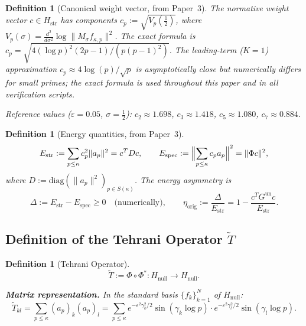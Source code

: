 \documentclass[11pt]{article}
\newtheorem{definition}[theorem]{Definition}
\newcommand{\Hstr}{H_{\mathrm{str}}}
\newcommand{\Hnull}{H_{\mathrm{null}}}
\newcommand{\Estr}{E_{\mathrm{str}}}
\newcommand{\Espec}{E_{\mathrm{spec}}}
\newcommand{\etaorig}{\eta_{\mathrm{orig}}}
\newcommand{\Gun}{G^{\mathrm{un}}}
\newcommand{\Tt}{\widetilde{T}}
\begin{document}
\begin{definition}[Canonical weight vector, from Paper~3]
The normative weight vector $c\in\Hstr$ has components
$c_p := \sqrt{V_p(\tfrac{1}{2})}$,
where $V_p(\sigma) = \tfrac{d^2}{d\sigma^2}\log\|M_\sigma f_{\kappa,p}\|^2$.
The exact formula is
$c_p = \sqrt{4(\log p)^2(2p-1)/(p(p-1)^2)}$.
The leading-term ($K=1$) approximation $c_p \approx 4\log(p)/\sqrt{p}$
is asymptotically close but numerically differs for small primes;
the exact formula is used throughout this paper and in all verification scripts.

Reference values ($\varepsilon=0.05$, $\sigma=\tfrac{1}{2}$):
$c_2\approx 1.698$, $c_3\approx 1.418$, $c_5\approx 1.080$,
$c_7\approx 0.884$.
\end{definition}

\begin{definition}[Energy quantities, from Paper~3]
\[
\Estr := \sum_{p\leq\kappa}c_p^2\|a_p\|^2 = c^T Dc,
\qquad
\Espec := \Bigl\|\sum_{p\leq\kappa}c_p a_p\Bigr\|^2 = \|\Phi c\|^2,
\]
where $D := \mathrm{diag}(\|a_p\|^2)_{p\in S(\kappa)}$.
The energy asymmetry is
\[
\Delta := \Estr - \Espec \geq 0\quad\text{(numerically)},
\qquad
\etaorig := \frac{\Delta}{\Estr}
= 1 - \frac{c^T\Gun c}{\Estr}.
\]
\end{definition}

\subsection{Definition of the Tehrani Operator $\widetilde{T}$}

\begin{definition}[Tehrani Operator]
\begin{equation}
\boxed{\Tt := \Phi\circ\Phi^*\colon\Hnull\to\Hnull.}
\end{equation}

\textbf{Matrix representation.}
In the standard basis $\{f_k\}_{k=1}^N$ of $\Hnull$:
\[
\Tt_{kl}
= \sum_{p\leq\kappa}(a_p)_k(a_p)_l
= \sum_{p\leq\kappa}
e^{-\varepsilon^2\gamma_k^2/2}\sin(\gamma_k\log p)
\cdot
e^{-\varepsilon^2\gamma_l^2/2}\sin(\gamma_l\log p).
\]
\end{definition}
\end{document}

